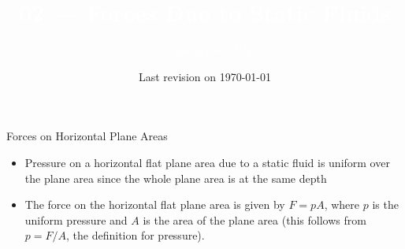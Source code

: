 \documentclass[9pt,xcolor={svgnames, x11names},professionalfonts, mathserif]{beamer}
\title[Static Fluids]{\Huge \textcolor{white}{02 --- Forces Due to Static Fluids}}
\subtitle[CIVL318]{\Large\textcolor{white}{Water Resources, CIVL318}}
\author{}
\institute{}
\date{Last revision on \today}
\begin{document}
\begin{frame}[plain]    %
 \titlepage
\end{frame}


\begin{frame}{Forces on Horizontal Plane Areas}
 \begin{itemize}
  \item Pressure on a horizontal flat plane area due to a static fluid is
        uniform over the plane area since the whole plane area is at the same depth\par\bigskip
        \pause
  \item The force on the horizontal flat plane area is given by $F=pA$, where $p$ is the
        uniform pressure and $A$ is the area of the plane area (this follows from $p=F/A$,
        the definition for pressure).
 \end{itemize}
\end{frame}



\begin{frame}
\end{frame}



\end{document}
